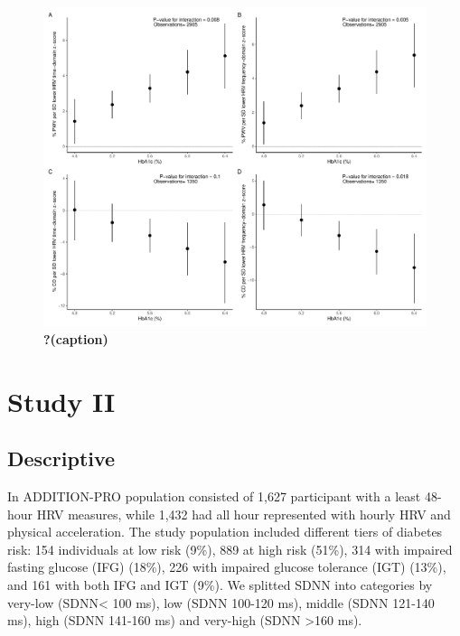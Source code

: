 \documentclass[
  a4paper,
  headsepline=true,
  open=any]{scrbook}
\begin{document}
\begin{figure}

{\centering \includegraphics{images/em_hba1c.pdf}

}

\caption{\label{fig-MS-HRV}\textbf{?(caption)}}

\end{figure}

\hypertarget{study-ii-1}{%
\section{Study II}\label{study-ii-1}}

\hypertarget{descriptive-1}{%
\subsection{Descriptive}\label{descriptive-1}}

In ADDITION-PRO population consisted of 1,627 participant with a least
48-hour HRV measures, while 1,432 had all hour represented with hourly
HRV and physical acceleration. The study population included different
tiers of diabetes risk: 154 individuals at low risk (9\%), 889 at high
risk (51\%), 314 with impaired fasting glucose (IFG) (18\%), 226 with
impaired glucose tolerance (IGT) (13\%), and 161 with both IFG and IGT
(9\%). We splitted SDNN into categories by very-low (SDNN\textless{} 100
ms), low (SDNN 100-120 ms), middle (SDNN 121-140 ms), high (SDNN 141-160
ms) and very-high (SDNN \textgreater160 ms).
\end{document}
